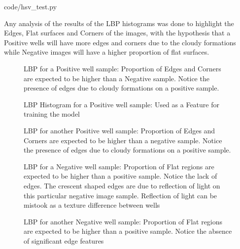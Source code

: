 \documentclass[a4paper,twoside,12pt]{report}
\begin{document}

{code/hsv_test.py}

Any analysis of the results of the LBP histograms was done to highlight the Edges, Flat surfaces and Corners of the images, with the hypothesis that a Positive wells will have more edges and corners due to the cloudy formations while Negative images will have a higher proportion of flat surfaces. 

\begin{figure} [!htbp]
\centering
\caption[LBP for a Positive well sample] {LBP for a Positive well sample: Proportion of Edges and Corners are expected to be higher than a Negative sample.  Notice the presence of edges due to cloudy formations on a positive sample.  }
\end{figure}

\begin{figure} [!htbp]
\centering
\caption[LBP Histogram for a Positive well sample] {LBP Histogram for a Positive well sample: Used as a Feature for training the model}
\end{figure}

\begin{figure} [!htbp]
\centering
\caption[LBP for another Positive well sample] {LBP for another Positive well sample: Proportion of Edges and Corners are expected to be higher than a negative sample. Notice the presence of edges due to cloudy formations on a positive sample.  }
\end{figure}

\begin{figure} [!htbp]
\centering
\caption[LBP for a Negative well sample] {LBP for a Negative well sample: Proportion of Flat regions are expected to be higher than a positive sample.  Notice the lack of edges.   The crescent shaped edges are due to reflection of light on this particular negative image sample.  Reflection of light can be mistook as a texture difference between wells}
\end{figure}

\begin{figure} [!htbp]
\centering
\caption[LBP for another Negative well sample] {LBP for another Negative well sample: Proportion of Flat regions are expected to be higher than a positive sample.  Notice the absence of significant edge features}
\end{figure}
\end{document}
